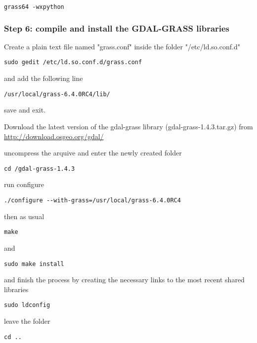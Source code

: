 \begin{verbatim}
grass64 -wxpython
\end{verbatim}

\subsubsection{Step 6: compile and install the GDAL-GRASS libraries}
Create a plain text file named "grass.conf" inside the folder "/etc/ld.so.conf.d"

\begin{verbatim}
sudo gedit /etc/ld.so.conf.d/grass.conf
\end{verbatim}

and add the following line

\begin{verbatim}
/usr/local/grass-6.4.0RC4/lib/
\end{verbatim}

save and exit.

Download the latest version of the gdal-grass library (gdal-grass-1.4.3.tar.gz) from
\url{http://download.osgeo.org/gdal/}

uncompress the arquive and enter the newly created folder

\begin{verbatim}
cd /gdal-grass-1.4.3
\end{verbatim}

run configure

\begin{verbatim}
./configure --with-grass=/usr/local/grass-6.4.0RC4
\end{verbatim}

then as usual

\begin{verbatim}
make
\end{verbatim}

and

\begin{verbatim}
sudo make install
\end{verbatim}

and finish the process by creating the necessary links to the most recent shared libraries

\begin{verbatim}
sudo ldconfig
\end{verbatim}

leave the folder 

\begin{verbatim}
cd ..
\end{verbatim}

